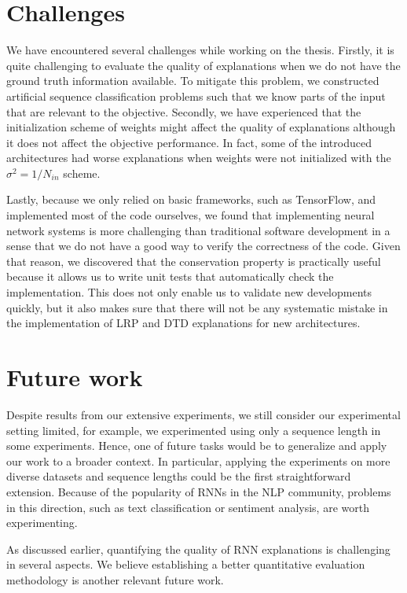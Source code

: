 \section{Challenges}
We have encountered several challenges while working on the thesis. Firstly, it is quite challenging to evaluate the quality of explanations when we do not have the ground truth information available. To mitigate this problem, we constructed artificial sequence classification problems such that we know parts of the input that are relevant to the objective.  Secondly, we have experienced that the initialization scheme of weights might affect the quality of explanations although it does not affect the objective performance. In fact, some of the introduced architectures had worse explanations when weights were not initialized with the $\sigma^2 = 1/N_{in}$ scheme.

Lastly, because we only relied on basic frameworks, such as TensorFlow, and implemented most of the code ourselves, we found that implementing neural network systems is more challenging than traditional software development in a sense that we do not have a good way to verify the correctness of the code. Given that reason, we discovered that the conservation property is practically useful because it allows us to write unit tests that automatically check the implementation. This does not only enable us to validate new developments quickly, but it also makes sure that there will not be any systematic mistake in the implementation of LRP and DTD explanations for new architectures.


\section{Future work}
Despite results from our extensive experiments, we still consider our experimental setting limited, for example, we experimented using only a sequence length in some experiments.  Hence, one of future tasks would be to generalize and apply our work to a broader context. In particular,  applying the experiments on more diverse datasets and sequence lengths could be the first straightforward extension. Because of the popularity of RNNs in the NLP community, problems in this direction, such as text classification or sentiment analysis, are worth experimenting. 

As discussed earlier, quantifying the quality of RNN explanations is challenging in several aspects. We believe establishing a better quantitative evaluation methodology is another relevant future work.